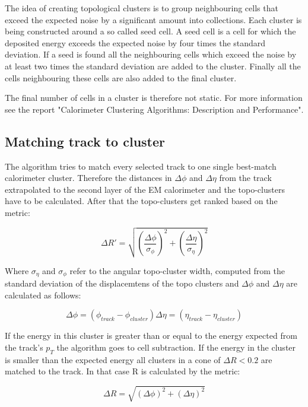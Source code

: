 The idea of creating topological clusters is to group neighbouring cells that exceed the expected noise by a significant amount into collections. 
Each cluster is being constructed around a so called seed cell. A seed cell is a cell for which the deposited energy exceeds the expected noise by four times the standard deviation. If a seed is found all the neighbouring cells which exceed the noise by at least two times the standard deviation are added to the cluster. Finally all the cells neighbouring these cells are also added to the final cluster.

The final number of cells in a cluster is therefore not static. For more information see the report "Calorimeter Clustering Algorithms: Description and Performance"\cite{cluster08}.


\subsection{Matching track to cluster}

The algorithm tries to match every selected track to one single best-match calorimeter cluster. 
Therefore the distances in $\Delta \phi$ and $\Delta \eta$ from the track extrapolated to the second layer of the EM calorimeter and the topo-clusters have to be calculated. After that the topo-clusters get ranked based on the metric:

\begin{equation}
\Delta R' = \sqrt{\left(\frac{\Delta \phi}{\sigma_{\phi}}\right)^2+\left(\frac{\Delta \eta}{\sigma_{\eta}}\right)^2}
\end{equation}

Where $\sigma_{\eta}$ and $\sigma_{\phi}$ refer to the angular topo-cluster width, computed from the standard deviation of the displacemtens of the topo clusters and $\Delta \phi$ and $\Delta \eta$ are calculated as follows:

\begin{equation}
\Delta \phi = (\phi_{track} - \phi_{cluster})
\Delta \eta = (\eta_{track} - \eta_{cluster})
\end{equation}

If the energy in this cluster is greater than or equal to the energy expected from the track's $p_T$ the algorithm goes to cell subtraction. If the energy in the cluster is smaller than the expected energy all clusters in a cone of $\Delta R < 0.2$ are matched to the track. In that case R is calculated by the metric:

\begin{equation}
\Delta R = \sqrt{(\Delta \phi)^2 + (\Delta \eta)^2}
\end{equation}

